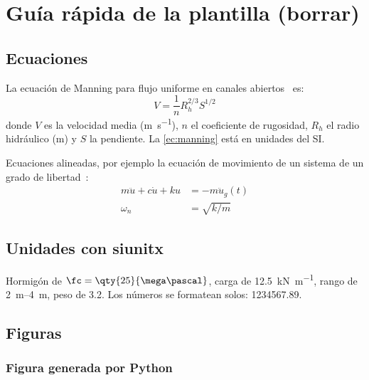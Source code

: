\chapter{Guía rápida de la plantilla (borrar)}
\label{anx:guia}

\section{Ecuaciones}
\label{sec:guia-ecuaciones}

La ecuación de Manning para flujo uniforme en canales abiertos~\parencite{chow1959open} es:
\begin{equation}
  V = \frac{1}{n} R_h^{2/3} S^{1/2}
  \label{ec:manning}
\end{equation}
donde $V$ es la velocidad media (\unit{\meter\per\second}), $n$ el coeficiente de rugosidad, $R_h$ el radio hidráulico (\unit{\meter}) y $S$ la pendiente.
La \cref{ec:manning} está en unidades del SI\@.

Ecuaciones alineadas, por ejemplo la ecuación de movimiento de un sistema de un grado de libertad~\parencite{chopra2017dynamics}:
\begin{align}
  m\ddot{u} + c\dot{u} + k u &= -m\ddot{u}_g(t) \label{ec:eom}\\
  \omega_n &= \sqrt{k/m}
\end{align}

\section{Unidades con siunitx}

Hormigón de $\fc = \qty{25}{\mega\pascal}$, carga de \qty{12.5}{\kilo\newton\per\meter}, rango de \qtyrange{2}{4}{\meter}, peso de \qty{3.2}{\tonf}.
Los números se formatean solos: \num{1234567.89}.

\section{Figuras}

\subsection{Figura generada por Python}

